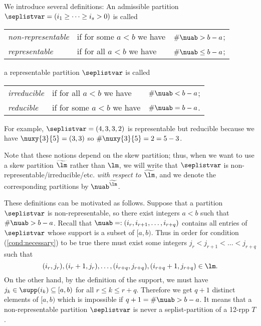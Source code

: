 \documentclass[numbers=enddot,12pt,final,onecolumn,notitlepage]{scrartcl}%
\theoremstyle{definition}
\begin{document}
We introduce several definitions: An admissible partition $\seplistvar=(i_1\geq \dots\geq i_s>0)$ is called

\begin{tabular}{@{$\bullet$ }lll}
 \textit{non-representable} & if for some $a<b$ we have & $\#\nuab>b-a$;\\
 \textit{representable}& if for all $a<b$ we have& $\#\nuab\leq b-a$;\\
\end{tabular}

a representable partition $\seplistvar$ is called

\begin{tabular}{@{$\bullet$ }lll} 
 \textit{irreducible}& if for all  $a<b$ we have &$\#\nuab < b-a$;\\
 \textit{reducible} &if for some $a<b$ we have &$\#\nuab=b-a$.
\end{tabular}

For example, $\seplistvar=(4,3,3,2)$ is representable but reducible because we have $\nuxy{3}{5}=(3,3)$ so $\#\nuxy{3}{5}=2=5-3$.

Note that these notions depend on the skew partition; thus, when we want to use a skew partition $\widetilde\lm$ rather than $\lm$, we will write that $\seplistvar$ is non-representable/irreducible/etc. \textit{with respect to $\widetilde\lm$}, and we denote the corresponding partitions by $\nuab^{\widetilde{\lm}}$.

These definitions can be motivated as follows. Suppose that a partition $\seplistvar$ is non-representable, so there exist integers $a<b$ such that $\#\nuab>b-a$. Recall that $\nuab=:(i_r,i_{r+1},\dots,i_{r+q})$ contains all entries of $\seplistvar$ whose support is a subset of $[a,b)$. Thus in order for condition (\ref{cond:necessary}) to be true there must exist some integers $j_r<j_{r+1}<\dots<j_{r+q}$ such that 
$$(i_r, j_r),(i_r+1, j_r),\dots,(i_{r+q},j_{r+q}),(i_{r+q}+1,j_{r+q})\in\lm.$$
On the other hand, by the definition of the support, we must have $j_k\in \supp(i_k)\subseteq [a,b)$ for all $r\leq k\leq r+q$. Therefore we get $q+1$ distinct elements of $[a,b)$ which is impossible if $q+1=\#\nuab>b-a$. It means that a non-representable partition $\seplistvar$ is never a seplist-partition of a 12-rpp $T$. 
\end{document}
